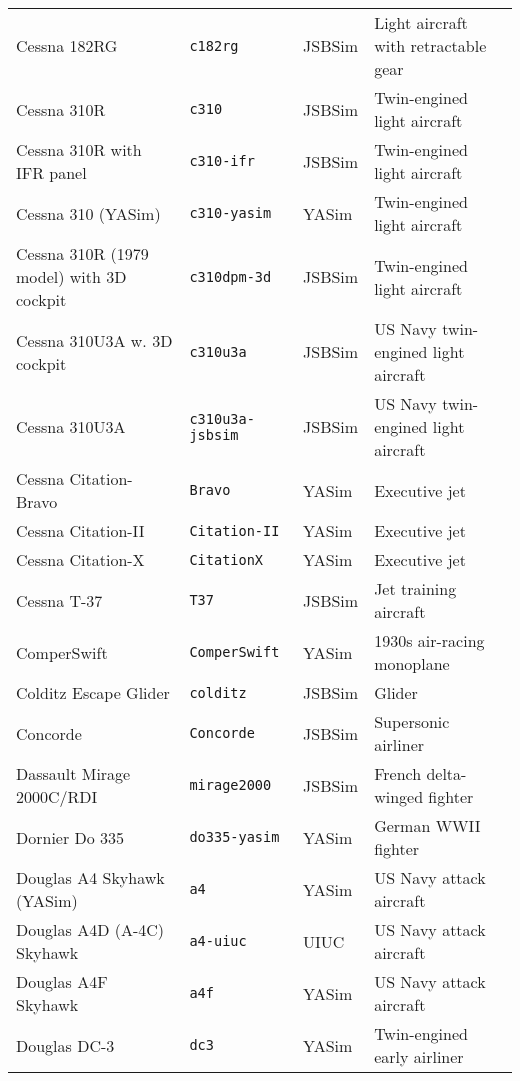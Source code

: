 \begin{tabular}{l|l|l|l}
   Cessna 182RG & \texttt{c182rg} & JSBSim & Light aircraft with retractable gear\\
   Cessna 310R & \texttt{c310} & JSBSim & Twin-engined light aircraft\\
   Cessna 310R with IFR panel & \texttt{c310-ifr} & JSBSim & Twin-engined light aircraft\\
   Cessna 310 (YASim) & \texttt{c310-yasim} & YASim & Twin-engined light aircraft\\
   Cessna 310R (1979 model) with 3D cockpit & \texttt{c310dpm-3d} & JSBSim & Twin-engined light aircraft\\
   Cessna 310U3A w. 3D cockpit & \texttt{c310u3a} & JSBSim & US Navy twin-engined light aircraft\\
   Cessna 310U3A & \texttt{c310u3a-jsbsim} & JSBSim & US Navy twin-engined light aircraft\\
   Cessna Citation-Bravo & \texttt{Bravo} & YASim  &  Executive jet\\
   Cessna Citation-II & \texttt{Citation-II} & YASim & Executive jet\\
   Cessna Citation-X & \texttt{CitationX} & YASim & Executive jet\\
   Cessna T-37 & \texttt{T37} & JSBSim & Jet training aircraft\\
   ComperSwift      & \texttt{ComperSwift} & YASim  &  1930s air-racing monoplane\\
   Colditz Escape Glider & \texttt{colditz} & JSBSim & Glider\\
   Concorde         & \texttt{Concorde}   & JSBSim  &  Supersonic airliner\\
   Dassault Mirage 2000C/RDI & \texttt{mirage2000} & JSBSim & French delta-winged fighter\\
   Dornier Do 335 & \texttt{do335-yasim} & YASim & German WWII fighter \\
   Douglas A4 Skyhawk (YASim) & \texttt{a4} & YASim & US Navy attack aircraft\\
   Douglas A4D (A-4C) Skyhawk & \texttt{a4-uiuc} & UIUC & US Navy attack aircraft\\
   Douglas A4F Skyhawk & \texttt{a4f} & YASim & US Navy attack aircraft\\
   Douglas DC-3 & \texttt{dc3} & YASim & Twin-engined early airliner\\
\end{tabular}
\noindent

